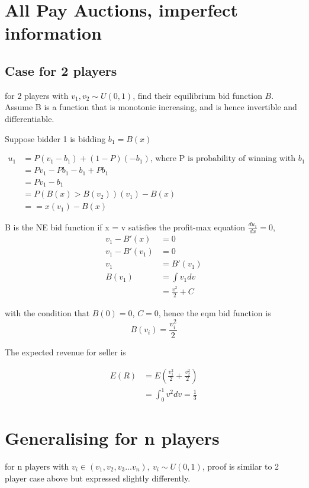 \documentclass[10pt, a4paper]{article}
\begin{document}
\section{All Pay Auctions, imperfect information}
\subsection{Case for 2 players}

for 2 players with $v_1, v_2 \sim U(0, 1)$, find their equilibrium bid function $B$. Assume B is a function that is monotonic increasing, and is hence invertible and differentiable. 

Suppose bidder 1 is bidding $b_1 = B(x)$ 

\begin{align*}
   u_1 &= P(v_1 - b_1) + (1-P)(-b_1) \text{, where P is probability of winning with $b_1$} \\
       &= Pv_1 - Pb_1 - b_1 + Pb_1 \\
       &= Pv_1 - b_1  \\
       &= P(B(x) > B(v_2))(v_1) - B(x) \\
       &= = x(v_1) -B(x)
\end{align*}

B is the NE bid function if x = v satisfies the profit-max equation $\frac{du_1}{dx} = 0$, 
\begin{align*}
   v_1 - B'(x) &= 0 \\
   v_1 - B'(v_1) &= 0 \\
   v_1 &= B'(v_1) \\
   B(v_1) &= \int v_1 dv\\
          &= \frac{v^2}{2} + C
\end{align*}

with the condition that $B(0) = 0$, $C = 0$, hence the eqm bid function is
\[ 
   B(v_i) = \frac{v_i^2}{2}
\]


The expected revenue for seller is 

\begin{align*}
   E(R) &= E\left(\frac{v_1^2}{2} + \frac{v_2^2}{2}\right) \\
        &= \int_0^1 v^2 dv = \frac{1}{3}
\end{align*}

\section{Generalising for n players}
for n players with $v_i \in (v_1, v_2, v_3 ... v_n),\ v_i \sim U(0, 1)$, proof is similar to 2 player case above but expressed slightly differently. \\
\end{document}
